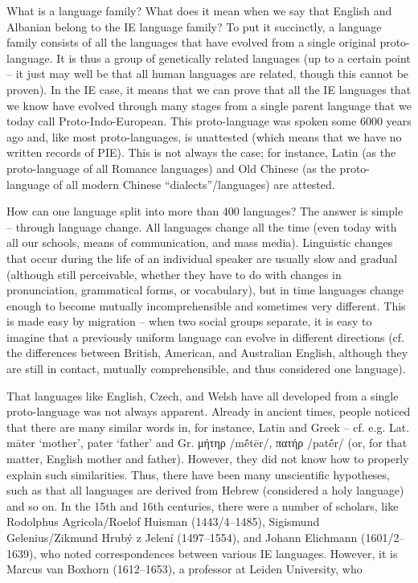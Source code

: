 What is a language family? What does it mean when we say that English and Albanian
belong to the IE language family? To put it succinctly, a language family consists of all
the languages that have evolved from a single original proto-language. It is thus a group
of genetically related languages (up to a certain point – it just may well be that all human
languages are related, though this cannot be proven). In the IE case, it means that we can
prove that all the IE languages that we know have evolved through many stages from a
single parent language that we today call Proto-Indo-European. This proto-language was 
spoken some 6000 years ago and, like most proto-languages, is unattested (which means
that we have no written records of PIE). This is not always the case; for instance, Latin (as
the proto-language of all Romance languages) and Old Chinese (as the proto-language of
all modern Chinese “dialects”/languages) are attested.

How can one language split into more than 400 languages? The answer is simple – through language change. All languages change all the time (even today with all our
schools, means of communication, and mass media). Linguistic changes that occur during
the life of an individual speaker are usually slow and gradual (although still perceivable,
whether they have to do with changes in pronunciation, grammatical forms, or vocabulary),
but in time languages change enough to become mutually incomprehensible and
sometimes very different. This is made easy by migration – when two social groups separate,
it is easy to imagine that a previously uniform language can evolve in different directions
(cf. the differences between British, American, and Australian English, although
they are still in contact, mutually comprehensible, and thus considered one language).

That languages like English, Czech, and Welsh have all developed from a single
proto-language was not always apparent. Already in ancient times, people noticed that
there are many similar words in, for instance, Latin and Greek – cf. e.g. Lat. māter
‘mother’, pater ‘father’ and Gr. μήτηρ /mḗtēr/, πατήρ /patḗr/ (or, for that matter, English
mother and father). However, they did not know how to properly explain such similarities.
Thus, there have been many unscientific hypotheses, such as that all languages
are derived from Hebrew (considered a holy language) and so on. In the 15th and 16th
centuries, there were a number of scholars, like Rodolphus Agricola/Roelof Huisman
(1443/4–1485), Sigismund Gelenius/Zikmund Hrubý z Jelení (1497–1554), and Johann
Elichmann (1601/2–1639), who noted correspondences between various IE languages.
However, it is Marcus van Boxhorn (1612–1653), a professor at Leiden University, who 

